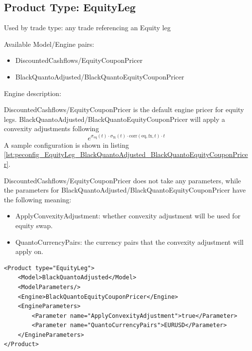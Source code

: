 \subsection{Product Type: EquityLeg}

Used by trade type: any trade referencing an Equity leg

Available Model/Engine pairs:

\begin{itemize}
  \item DiscountedCashflows/EquityCouponPricer
  \item BlackQuantoAdjusted/BlackQuantoEquityCouponPricer
\end{itemize}

Engine description:

DiscountedCashflows/EquityCouponPricer is the default engine pricer for equity legs. BlackQuantoAdjusted/BlackQuantoEquityCouponPricer
will apply a convexity adjustments following 
\[e^{\sigma_{\text{eq}}(t) \cdot \sigma_{\text{fx}}(t) \cdot \text{corr}(\text{eq}, \text{fx}, t) \cdot t}\]
A sample configuration is shown in listing
\ref{lst:peconfig_EquityLeg_BlackQuantoAdjusted_BlackQuantoEquityCouponPricer}.

DiscountedCashflows/EquityCouponPricer does not take any parameters, while the parameters for BlackQuantoAdjusted/BlackQuantoEquityCouponPricer have the following meaning:

\begin{itemize}
\item ApplyConvexityAdjustment: whether convexity adjustment will be used for equity swap.
\item QuantoCurrencyPairs: the currency pairs that the convexity adjustment will apply on.

\end{itemize}

\begin{longlisting}
\begin{verbatim}
<Product type="EquityLeg">
    <Model>BlackQuantoAdjusted</Model>
    <ModelParameters/>
    <Engine>BlackQuantoEquityCouponPricer</Engine>
    <EngineParameters>
        <Parameter name="ApplyConvexityAdjustment">true</Parameter>
        <Parameter name="QuantoCurrencyPairs">EURUSD</Parameter>
    </EngineParameters>
</Product>
\end{verbatim}
\caption{Configuration for Product EquityLeg, Model BlackQuantoAdjusted, Engine BlackQuantoEquityCouponPricer}
\label{lst:peconfig_EquityLeg_BlackQuantoAdjusted_BlackQuantoEquityCouponPricer}
\end{longlisting}


